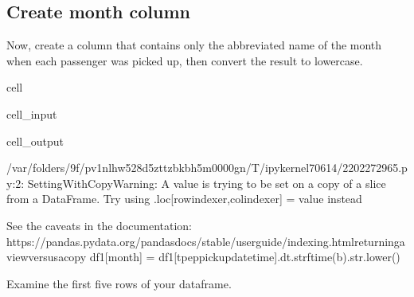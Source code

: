 \documentclass[letterpaper,10pt,english]{sphinxmanual}
\begin{document}
\subsection{Create month column}
\label{\detokenize{Automatidata_Machine Learning:create-month-column}}
\sphinxAtStartPar
Now, create a  column that contains only the abbreviated name of the month when each passenger was picked up, then convert the result to lowercase.

\begin{sphinxuseclass}{cell}
\begin{sphinxuseclass}{cell_input}
\begin{sphinxVerbatim}[commandchars=\\\{\}]
\PYG{p}{[}\PYG{p}{]}  \PYG{p}{[}\PYG{p}{]}
\end{sphinxVerbatim}

\end{sphinxuseclass}
\begin{sphinxuseclass}{cell_output}
\begin{sphinxVerbatim}[commandchars=\\\{\}]
/var/folders/9f/pv1nlhw528d\PYGZus{}5zttzbkb\PYGZus{}h5m0000gn/T/ipykernel\PYGZus{}70614/2202272965.py:2: SettingWithCopyWarning: 
A value is trying to be set on a copy of a slice from a DataFrame.
Try using .loc[row\PYGZus{}indexer,col\PYGZus{}indexer] = value instead

See the caveats in the documentation: https://pandas.pydata.org/pandas\PYGZhy{}docs/stable/user\PYGZus{}guide/indexing.html\PYGZsh{}returning\PYGZhy{}a\PYGZhy{}view\PYGZhy{}versus\PYGZhy{}a\PYGZhy{}copy
  df1[\PYGZsq{}month\PYGZsq{}] = df1[\PYGZsq{}tpep\PYGZus{}pickup\PYGZus{}datetime\PYGZsq{}].dt.strftime(\PYGZsq{}\PYGZpc{}b\PYGZsq{}).str.lower()
\end{sphinxVerbatim}

\end{sphinxuseclass}
\end{sphinxuseclass}
\sphinxAtStartPar
Examine the first five rows of your dataframe.
\end{document}
